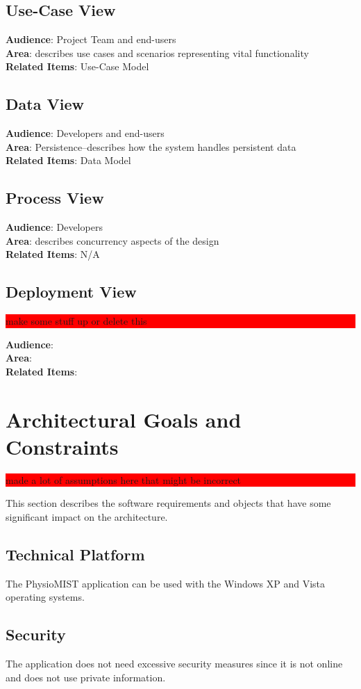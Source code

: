 \documentclass{article}
\newcommand{\todo}[1]{\colorbox{red}{\begin{minipage}{\textwidth}{#1}\end{minipage}}}
\begin{document}
\subsection{Use-Case View}
\textbf{Audience}: Project Team and end-users\\
\textbf{Area}: describes use cases and scenarios representing vital functionality\\
\textbf{Related Items}: Use-Case Model
\subsection{Data View}
\textbf{Audience}: Developers and end-users\\
\textbf{Area}: Persistence--describes how the system handles persistent data\\
\textbf{Related Items}: Data Model
\subsection{Process View}
\textbf{Audience}: Developers\\
\textbf{Area}: describes concurrency aspects of the design\\
\textbf{Related Items}: N/A
\subsection{Deployment View}
\todo{make some stuff up or delete this}
\textbf{Audience}:\\
\textbf{Area}:\\
\textbf{Related Items}:

\section{Architectural Goals and Constraints}
\todo{made a lot of assumptions here that might be incorrect}
This section describes the software requirements and objects that have some significant impact on the architecture.
\subsection{Technical Platform}
The PhysioMIST application can be used with the Windows XP and Vista operating systems.
\subsection{Security}
The application does not need excessive security measures since it is not online and does not use private information.
\end{document}
